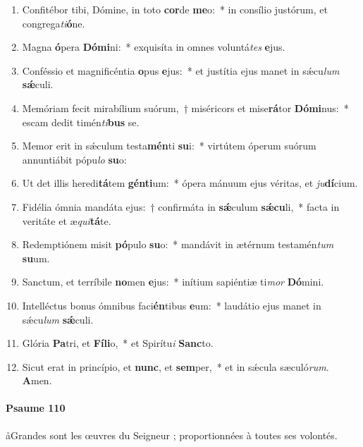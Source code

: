 \documentclass[twoside]{article}
\begin{document}
\begin{paracol}[1]{2}
\begin{enumerate}[wide, itemsep=0mm, labelwidth=!, labelindent=0pt, label=\color{gregoriocolor}\theenumi]
\item Confitébor tibi, Dómine, in toto \textbf{cor}de \textbf{me}o:~* in consílio justórum, et congrega\textit{ti}\textbf{ó}ne.
\item Magna \textbf{ó}pera \textbf{Dó}\textbf{mi}ni:~* exquisíta in omnes voluntá\textit{tes} \textbf{e}jus.
\item Conféssio et magnificéntia \textbf{o}pus \textbf{e}jus:~* et justítia ejus manet in sǽcu\textit{lum} \textbf{sǽ}culi.
\item Memóriam fecit mirabílium suórum,~† miséricors et mise\textbf{rá}tor \textbf{Dó}\textbf{mi}nus:~* escam dedit timén\textit{ti}\textbf{bus} se.
\item Memor erit in sǽculum testa\textbf{mén}ti \textbf{su}i:~* virtútem óperum suórum annuntiábit pópu\textit{lo} \textbf{su}o:
\item Ut det illis heredi\textbf{tá}tem \textbf{gén}\textbf{ti}um:~* ópera mánuum ejus véritas, et \textit{ju}\textbf{dí}cium.
\item Fidélia ómnia mandáta ejus:~† confirmáta in \textbf{sǽ}culum \textbf{sǽ}\textbf{cu}li,~* facta in veritáte et æ\textit{qui}\textbf{tá}te.
\item Redemptiónem misit \textbf{pó}pulo \textbf{su}o:~* mandávit in ætérnum testamén\textit{tum} \textbf{su}um.
\item {} Sanctum, et terríbile \textbf{no}men \textbf{e}jus:~* inítium sapiéntiæ ti\textit{mor} \textbf{Dó}mini.
\item Intelléctus bonus ómnibus faci\textbf{én}tibus \textbf{e}um:~* laudátio ejus manet in sǽcu\textit{lum} \textbf{sǽ}culi.
\item Glória \textbf{Pa}tri, et \textbf{Fí}\textbf{li}o,~* et Spirítu\textit{i} \textbf{Sanc}to.
\item Sicut erat in princípio, et \textbf{nunc}, et \textbf{sem}per,~* et in sǽcula sæculó\textit{rum}. \textbf{A}men.
\end{enumerate}

\switchcolumn

\paragraph{Psaume 110}
\aa Grandes sont les œuvres du Seigneur ;
proportionnées à toutes ses volontés.




\end{paracol}
\end{document}
